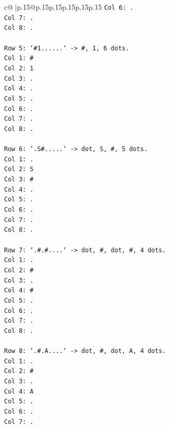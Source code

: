 \documentclass{article}
\begin{document}
{\begin{supertabular}{c@{$\;$}|p{.15\linewidth}@{}p{.15\linewidth}p{.15\linewidth}p{.15\linewidth}p{.15\linewidth}p{.15\linewidth}}
{{{\texttt{Col 6: .} \\
\texttt{Col 7: .} \\
\texttt{Col 8: .} \\
\\ 
\texttt{Row 5: `\#1......` {-}> \#, 1, 6 dots.} \\
\texttt{Col 1: \#} \\
\texttt{Col 2: 1} \\
\texttt{Col 3: .} \\
\texttt{Col 4: .} \\
\texttt{Col 5: .} \\
\texttt{Col 6: .} \\
\texttt{Col 7: .} \\
\texttt{Col 8: .} \\
\\ 
\texttt{Row 6: `.S\#.....` {-}> dot, S, \#, 5 dots.} \\
\texttt{Col 1: .} \\
\texttt{Col 2: S} \\
\texttt{Col 3: \#} \\
\texttt{Col 4: .} \\
\texttt{Col 5: .} \\
\texttt{Col 6: .} \\
\texttt{Col 7: .} \\
\texttt{Col 8: .} \\
\\ 
\texttt{Row 7: `.\#.\#....` {-}> dot, \#, dot, \#, 4 dots.} \\
\texttt{Col 1: .} \\
\texttt{Col 2: \#} \\
\texttt{Col 3: .} \\
\texttt{Col 4: \#} \\
\texttt{Col 5: .} \\
\texttt{Col 6: .} \\
\texttt{Col 7: .} \\
\texttt{Col 8: .} \\
\\ 
\texttt{Row 8: `.\#.A....` {-}> dot, \#, dot, A, 4 dots.} \\
\texttt{Col 1: .} \\
\texttt{Col 2: \#} \\
\texttt{Col 3: .} \\
\texttt{Col 4: A} \\
\texttt{Col 5: .} \\
\texttt{Col 6: .} \\
\texttt{Col 7: .} \\
}}}
\end{supertabular}}
\end{document}
